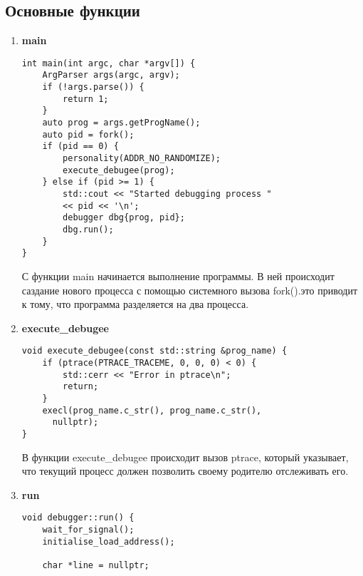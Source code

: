 \documentclass[oneside,final,14pt]{extreport}
\begin{document}
\subsection{Основные функции}
	\begin{enumerate}
	\item  {\bf main} 
	\begin{lstlisting}
int main(int argc, char *argv[]) {
    ArgParser args(argc, argv);
    if (!args.parse()) {
        return 1;
    }
    auto prog = args.getProgName();
    auto pid = fork();
    if (pid == 0) {
        personality(ADDR_NO_RANDOMIZE);
        execute_debugee(prog);
    } else if (pid >= 1) {
        std::cout << "Started debugging process " 
        << pid << '\n';
        debugger dbg{prog, pid};
        dbg.run();
    }
}
	\end{lstlisting}
	С функции main начинается выполнение программы. В ней происходит саздание нового процесса с помощью системного вызова fork().это приводит к тому, что программа разделяется на два процесса. 
	\item  {\bf execute\_debugee}
	\begin{lstlisting}
void execute_debugee(const std::string &prog_name) {
    if (ptrace(PTRACE_TRACEME, 0, 0, 0) < 0) {
        std::cerr << "Error in ptrace\n";
        return;
    }
    execl(prog_name.c_str(), prog_name.c_str(),
      nullptr);
}
	\end{lstlisting}
	В функции execute\_debugee происходит вызов ptrace, который указывает, что текущий процесс должен позволить своему родителю отслеживать его. 
	\item  {\bf run} 
	\noindent
    \begin{lstlisting}
void debugger::run() {
    wait_for_signal();
    initialise_load_address();
	
    char *line = nullptr;
	

\end{lstlisting}
\end{enumerate}
\end{document}

